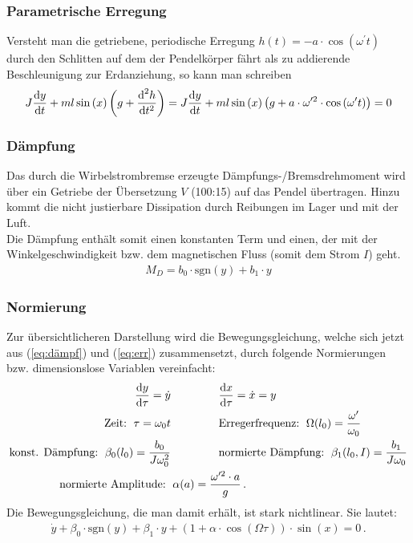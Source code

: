 \documentclass[numbers=noenddot,12pt,a4paper]{scrartcl}
\newcommand{\diff}{\textnormal{d}}
\newcommand{\sgn}[1]{\text{sgn}\left(#1\right)}
\begin{document}
\subsubsection{Parametrische Erregung}
Versteht man die getriebene, periodische Erregung $h(t)=-a\cdot \cos\left(\omega^\prime t\right)$ durch den Schlitten auf dem der Pendelkörper fährt als zu addierende Beschleunigung zur Erdanziehung, so kann man schreiben
\begin{align}
J\frac{\diff y}{\diff t}+ml\sin\left(x\right)\left(g+\frac{\diff^2 h}{\diff t^2}\right)=J\frac{\diff y}{\diff t}+ml\sin\left(x\right)\left(g+a\cdot \omega^{\prime 2}\cdot \cos\left(\omega^\prime t\right)\right)=0 \label{eq:err}
\end{align}
\subsubsection{Dämpfung}
Das durch die Wirbelstrombremse erzeugte Dämpfungs-/Bremsdrehmoment wird über ein Getriebe der Übersetzung $V$ (100:15) auf das Pendel übertragen. Hinzu kommt die nicht justierbare Dissipation durch Reibungen im Lager und mit der Luft.\\
Die Dämpfung enthält somit einen konstanten Term und einen, der mit der Winkelgeschwindigkeit bzw. dem magnetischen Fluss (somit dem Strom $I$) geht.
\begin{align}
M_D=b_0\cdot\sgn{y}+b_1\cdot y \label{eq:dämpf}
\end{align}
\subsubsection{Normierung}
Zur übersichtlicheren Darstellung wird die Bewegungsgleichung, welche sich jetzt aus (\ref{eq:dämpf}) und (\ref{eq:err}) zusammensetzt, durch folgende Normierungen bzw. dimensionslose Variablen vereinfacht:
\begin{align}
\frac{\diff y}{\diff \tau}=\dot y &\hspace{1.5cm} \frac{\diff x}{\diff \tau}=\dot x=y\\
\text{Zeit: } \, \tau=\omega_0 t &\hspace{1.5cm} \text{Erregerfrequenz: } \, \Omega(l_0)=\frac{\omega^\prime}{\omega_0} \\
\text{konst. Dämpfung: } \, \beta_0(l_0)=\frac{b_0}{J\omega_0^2} &\hspace{1.5cm} \text{normierte Dämpfung: } \, \beta_1(l_0, I)=\frac{b_1}{J\omega_0} \\
\text{normierte Amplitude: }& \, \alpha(a)=\frac{\omega^{\prime 2}\cdot a}{g} \, .
\end{align}
Die Bewegungsgleichung, die man damit erhält, ist stark nichtlinear. Sie lautet:
\begin{align}
\dot y+\beta_0\cdot\sgn{y}+\beta_1\cdot y+ \left(1+\alpha\cdot\cos\left(\Omega \tau\right)\right)\cdot\sin\left(x\right)=0 \, .
\end{align}
\end{document}

